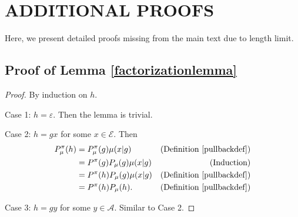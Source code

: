\documentclass[twoside]{article}
\begin{document}
\section{ADDITIONAL PROOFS}

Here, we present detailed proofs missing from the main text due to length limit.

\subsection{Proof of Lemma \ref{factorizationlemma}}
\begin{proof}
    By induction on $h$.

    Case 1: $h=\varepsilon$. Then the lemma is trivial.

    Case 2: $h=gx$ for some $x\in\mathcal E$.
        Then
        \begin{align*}
            P^\pi_\mu(h)
                &= P^\pi_\mu(g)\mu(x|g)
                    &\mbox{(Definition \ref{pullbackdef})}\\
                &= P^\pi(g)P_\mu(g)\mu(x|g)
                    &\mbox{(Induction)}\\
                &= P^\pi(h)P_\mu(g)\mu(x|g)
                    &\mbox{(Definition \ref{pullbackdef})}\\
                &= P^\pi(h)P_\mu(h).
                    &\mbox{(Definition \ref{pullbackdef})}
        \end{align*}

    Case 3: $h=gy$ for some $y\in\mathcal A$.
        Similar to Case 2.
\end{proof}
\end{document}
